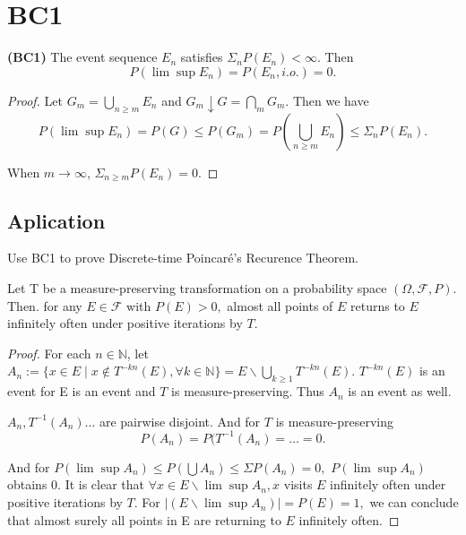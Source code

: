 \section{BC1}
\begin{theorem}
  \textbf{(BC1)} The event sequence $E_n$ satisfies $\Sigma_n P(E_n) < \infty.$ Then 
  $$P(\lim \sup E_n) = P(E_n,i.o.) = 0.$$

\end{theorem}
\begin{proof}
  Let $G_m = \bigcup_{n\geq m} E_n$ and $G_m\downarrow G = \bigcap_m G_m.$ Then we have 
  $$P(\lim\sup E_n) = P(G) \leq P(G_m) = P(\bigcup_{n\geq m} E_n) \leq \Sigma_n P(E_n).$$
  
  When $m \to \infty$,  $\Sigma_{n\geq m} P(E_n) = 0.$
\end{proof}

\subsection{Aplication}
Use BC1 to prove Discrete-time Poincar\'e's Recurence Theorem.
\begin{theorem}
  Let T be a measure-preserving transformation on a probability space $(\Omega,\mathcal F, P).$ Then. for any $E\in \mathcal F$ with $P(E) > 0,$ almost all points of $E$ returns to $E$ infinitely often under positive iterations by $T$.
\end{theorem}
\begin{proof}
  For each $n\in \mathbb N$, let $A_n := \{x\in E\mid x\notin T^{-kn}(E),\forall k\in \mathbb N\} = E\backslash \bigcup
_{k\ge 1}T^{-kn}(E).$ $T^{-kn}(E)$ is an event for E is an event and $T$ is measure-preserving. Thus $A_n$ is an event as well.


$A_n, T^{-1}(A_n)\dots$  are pairwise disjoint. And for $T$ is measure-preserving
$$P(A_n) = P(T^{-1}(A_n) = \dots = 0.$$

And for $P(\lim\sup A_n) \leq P(\bigcup A_n) \leq \Sigma P(A_n) = 0,$ $P(\lim \sup A_n)$ obtains 0. It  is clear that $\forall x\in E\backslash \lim\sup A_n,x$ visits $E$ infinitely often under positive iterations by $T$. For $|(E\backslash \lim\sup A_n)|= P(E) = 1,$ we can conclude that almost surely all points in E are returning to $E$ infinitely often. 

\end{proof}

























